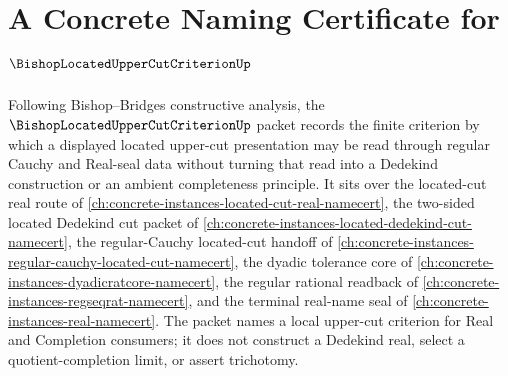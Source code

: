 \chapter{A Concrete Naming Certificate for $\BishopLocatedUpperCutCriterionUp$}
\label{ch:concrete-instances-bishop-located-upper-cut-criterion-namecert}

Following Bishop--Bridges constructive analysis, the $\BishopLocatedUpperCutCriterionUp$ packet records the finite criterion by which a displayed located upper-cut presentation may be read through regular Cauchy and Real-seal data without turning that read into a Dedekind construction or an ambient completeness principle. It sits over the located-cut real route of \autoref{ch:concrete-instances-located-cut-real-namecert}, the two-sided located Dedekind cut packet of \autoref{ch:concrete-instances-located-dedekind-cut-namecert}, the regular-Cauchy located-cut handoff of \autoref{ch:concrete-instances-regular-cauchy-located-cut-namecert}, the dyadic tolerance core of \autoref{ch:concrete-instances-dyadicratcore-namecert}, the regular rational readback of \autoref{ch:concrete-instances-regseqrat-namecert}, and the terminal real-name seal of \autoref{ch:concrete-instances-real-namecert}. The packet names a local upper-cut criterion for Real and Completion consumers; it does not construct a Dedekind real, select a quotient-completion limit, or assert trichotomy.

